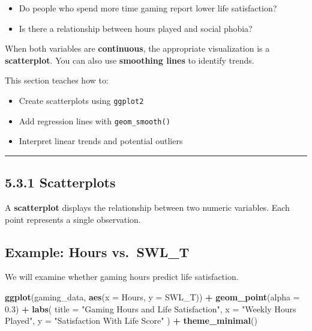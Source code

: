 \documentclass[
]{book}
\newenvironment{Shaded}{\begin{snugshade}}{\end{snugshade}}
\newcommand{\AttributeTok}[1]{\textcolor[rgb]{0.13,0.29,0.53}{#1}}
\newcommand{\FloatTok}[1]{\textcolor[rgb]{0.00,0.00,0.81}{#1}}
\newcommand{\FunctionTok}[1]{\textcolor[rgb]{0.13,0.29,0.53}{\textbf{#1}}}
\newcommand{\NormalTok}[1]{#1}
\newcommand{\SpecialCharTok}[1]{\textcolor[rgb]{0.81,0.36,0.00}{\textbf{#1}}}
\newcommand{\StringTok}[1]{\textcolor[rgb]{0.31,0.60,0.02}{#1}}
\providecommand{\tightlist}{%
  \setlength{\itemsep}{0pt}\setlength{\parskip}{0pt}}
\begin{document}
\begin{itemize}
\item
  Do people who spend more time gaming report lower life satisfaction?
\item
  Is there a relationship between hours played and social phobia?
\end{itemize}

When both variables are \textbf{continuous}, the appropriate visualization is a \textbf{scatterplot}. You can also use \textbf{smoothing lines} to identify trends.

This section teaches how to:

\begin{itemize}
\tightlist
\item
  Create scatterplots using \texttt{ggplot2}
\item
  Add regression lines with \texttt{geom\_smooth()}
\item
  Interpret linear trends and potential outliers
\end{itemize}

\begin{center}\rule{0.5\linewidth}{0.5pt}\end{center}

\subsection{5.3.1 Scatterplots}\label{scatterplots}

A \textbf{scatterplot} displays the relationship between two numeric variables. Each point represents a single observation.

\subsection{Example: Hours vs.~SWL\_T}\label{example-hours-vs.-swl_t}

We will examine whether gaming hours predict life satisfaction.

\begin{Shaded}
\begin{Highlighting}[]
\FunctionTok{ggplot}\NormalTok{(gaming\_data, }\FunctionTok{aes}\NormalTok{(}\AttributeTok{x =}\NormalTok{ Hours, }\AttributeTok{y =}\NormalTok{ SWL\_T)) }\SpecialCharTok{+}
  \FunctionTok{geom\_point}\NormalTok{(}\AttributeTok{alpha =} \FloatTok{0.3}\NormalTok{) }\SpecialCharTok{+}
  \FunctionTok{labs}\NormalTok{(}
    \AttributeTok{title =} \StringTok{"Gaming Hours and Life Satisfaction"}\NormalTok{,}
    \AttributeTok{x =} \StringTok{"Weekly Hours Played"}\NormalTok{,}
    \AttributeTok{y =} \StringTok{"Satisfaction With Life Score"}
\NormalTok{  ) }\SpecialCharTok{+}
  \FunctionTok{theme\_minimal}\NormalTok{()}
\end{Highlighting}
\end{Shaded}
\end{document}
